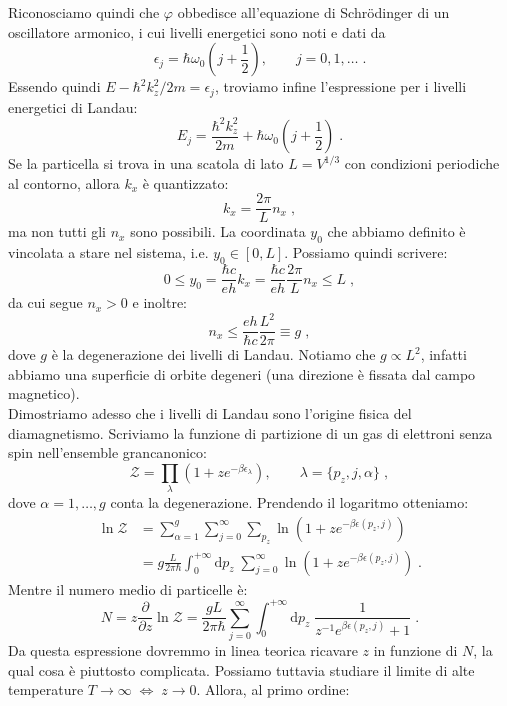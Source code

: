 \documentclass[10pt,a4paper]{report}
\theoremstyle{definition}
\numberwithin{equation}{section}
\newcommand{\diff}[1][]{\mathrm{d}#1}
\newcommand{\Sch}{Schrödinger}
\newcommand{\zpart}{\mathcal{Z}}
\begin{document}
Riconosciamo quindi che $\varphi$ obbedisce all'equazione di \Sch\; di un oscillatore armonico, i cui livelli energetici sono noti e dati da
\begin{equation}
\epsilon_j=\hbar\omega_0\left(j+\frac{1}{2}\right),\qquad j=0,1,\ldots\;.
\end{equation}
Essendo quindi $E-\hbar^2k_z^2/2m=\epsilon_j$, troviamo infine l'espressione per i livelli energetici di Landau:
\begin{equation}
\boxed{E_j=\frac{\hbar^2k_z^2}{2m}+\hbar\omega_0\left(j+\frac{1}{2}\right)}\;.
\end{equation}
Se la particella si trova in una scatola di lato $L=V^{1/3}$ con condizioni periodiche al contorno, allora $k_x$ è quantizzato:
\begin{equation}
k_x=\frac{2\pi}{L}n_x\;,
\end{equation}
ma non tutti gli $n_x$ sono possibili. La coordinata $y_0$ che abbiamo definito è vincolata a stare nel sistema, i.e. $y_0\in [0,L]$. Possiamo quindi scrivere:
$$
0\le y_0=\frac{\hbar c}{eh}k_x=\frac{\hbar c}{eh}\frac{2\pi}{L}n_x\le L\;,
$$
da cui segue $n_x>0$ e inoltre:
\begin{equation}
n_x\le \frac{eh}{\hbar c}\frac{L^2}{2\pi}\equiv g\;,
\end{equation}
dove $g$ è la degenerazione dei livelli di Landau. Notiamo che $g\propto L^2$, infatti abbiamo una superficie di orbite degeneri (una direzione è fissata dal campo magnetico). \\
Dimostriamo adesso che i livelli di Landau sono l'origine fisica del diamagnetismo. Scriviamo la funzione di partizione di un  gas di elettroni senza spin nell'ensemble grancanonico:
$$
\zpart=\prod_{\lambda}\left(1+ze^{-\beta\epsilon_{\lambda}}\right),\qquad \lambda=\{p_z,j,\alpha\}\;,
$$
dove $\alpha=1,\ldots,g$ conta la degenerazione. Prendendo il logaritmo otteniamo:
\begin{align*}
\ln\zpart &= \sum_{\alpha=1}^g\sum_{j=0}^{\infty}\sum_{p_z}\ln\left(1+ze^{-\beta\epsilon(p_z,j)}\right) \\
&=  g\frac{L}{2\pi\hbar}\int_0^{+\infty}\diff{p_z}\;\sum_{j=0}^{\infty}\ln\left(1+ze^{-\beta\epsilon(p_z,j)}\right)\;.
\end{align*}
Mentre il numero medio di particelle è:
$$
N=z\frac{\partial}{\partial z}\ln\zpart=\frac{gL}{2\pi\hbar}\sum_{j=0}^{\infty}\int_0^{+\infty}\diff{p_z}\;\frac{1}{z^{-1}e^{\beta\epsilon(p_z,j)}+1}\;.
$$
Da questa espressione dovremmo in linea teorica ricavare $z$ in funzione di $N$, la qual cosa è piuttosto complicata. Possiamo tuttavia studiare il limite di alte temperature $T\to\infty \;\Longleftrightarrow\; z\to 0$. Allora, al primo ordine:
\end{document}
